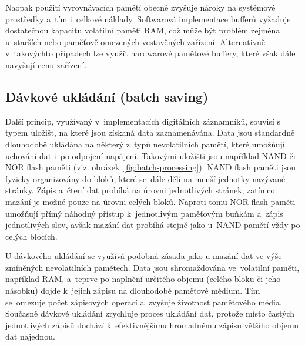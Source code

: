 Naopak použití vyrovnávacích pamětí obecně zvyšuje nároky na systémové prostředky a~tím i~celkové náklady. Softwarová implementace bufferů vyžaduje dostatečnou kapacitu volatilní paměti RAM, což může být problém zejména u~starších nebo paměťově omezených vestavěných zařízení. Alternativně v~takovýchto případech lze využít hardwarové paměťové buffery, které však dále navyšují cenu zařízení.~\cite{buffering_chang, multiple_buffering_batch_saving, double_buffering_model}

\newpage


\subsection{Dávkové ukládání (batch saving)}
\label{davkove_zpracovani}
Další princip, využívaný v~implementacích digitálních záznamníků, souvisí s typem uložišť, na které jsou získaná data zaznamenávána. Data jsou standardně dlouhodobě ukládána na některý z~typů nevolatilních pamětí, které umožňují uchování dat i~po odpojení napájení. Takovými uložišti jsou například NAND či NOR flash paměti (viz. obrázek~\ref{fig:batch-processing}). NAND flash paměti jsou fyzicky organizovány do bloků, které se~dále dělí na menší jednotky nazývané stránky. Zápis a~čtení dat probíhá na úrovni jednotlivých stránek, zatímco mazání je možné pouze na úrovni celých bloků.  Naproti tomu NOR flash paměti umožňují přímý náhodný přístup k~jednotlivým paměťovým buňkám a~zápis jednotlivých slov, avšak mazání dat probíhá stejně jako u~NAND pamětí vždy po celých blocích.~\cite{non_volatile_memories, ieee_relationships_among_region_segment_frame_and_cluster}

U dávkového ukládání se využívá podobná zásada jako u mazání dat ve výše zmíněných nevolatilních pamětech. Data jsou shromažďována ve~volatilní paměti, například RAM, a~teprve po naplnění určitého objemu (celého bloku či jeho násobku) dojde k~jejich zápisu na dlouhodobé paměťové médium. Tím se~omezuje počet zápisových operací a~zvyšuje životnost paměťového média. Současně dávkové ukládání zrychluje proces ukládání dat, protože místo častých jednotlivých zápisů dochází k~efektivnějšímu hromadnému zápisu většího objemu dat najednou.~\cite{non_volatile_memories, ieee_digital_sound_recorder_arm_sd_card, ieee_relationships_among_region_segment_frame_and_cluster}

